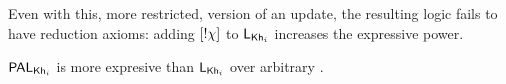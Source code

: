 
Even with this, more restricted, version of an update, the resulting logic fails to have reduction axioms: adding $[!\chi]$ to $\mathsf{L}_{{\sf Kh}_i}$ increases the expressive power.

\medskip 

\begin{proposition}\label{prop:exppal}
	$\mathsf{PAL}_{{\sf Kh}_i}$ is more expresive than $\mathsf{L}_{{\sf Kh}_i}$ over arbitrary \ultss.
\end{proposition}

